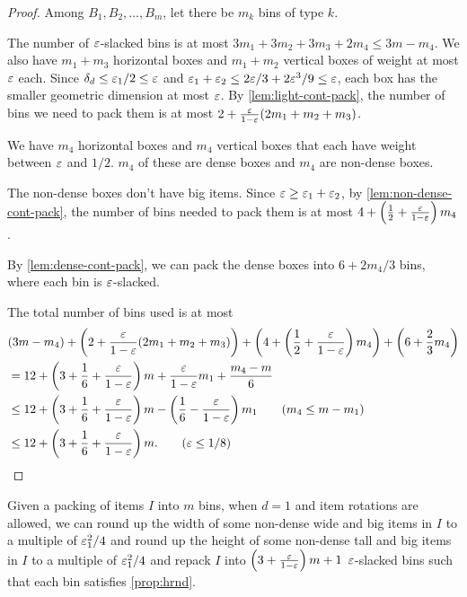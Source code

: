 \begin{proof}
Among $B_1, B_2, \ldots, B_m$, let there be $m_k$ bins of type $k$.

The number of $\varepsilon$-slacked bins is at most
$3m_1 + 3m_2 + 3m_3 + 2m_4 \le 3m - m_4$.
We also have $m_1 + m_3$ horizontal boxes and $m_1 + m_2$ vertical boxes
of weight at most $\varepsilon$ each. Since $\delta_d \le \varepsilon_1/2 \le \varepsilon$
and $\varepsilon_1 + \varepsilon_2 \le 2\varepsilon/3 + 2\varepsilon^3/9 \le \varepsilon$, each box has the smaller
geometric dimension at most $\varepsilon$.
By \cref{lem:light-cont-pack}, the number of bins we need to pack them is at most
$2 + \frac{\varepsilon}{1-\varepsilon}(2m_1 + m_2 + m_3)$.

We have $m_4$ horizontal boxes and $m_4$ vertical boxes
that each have weight between $\varepsilon$ and $1/2$.
$m_4$ of these are dense boxes and $m_4$ are non-dense boxes.

The non-dense boxes don't have big items. Since $\varepsilon \ge \varepsilon_1 + \varepsilon_2$,
by \cref{lem:non-dense-cont-pack}, the number of bins needed to pack them is at most
$4 + \left(\frac{1}{2} + \frac{\varepsilon}{1-\varepsilon}\right)m_4$.

By \cref{lem:dense-cont-pack}, we can pack the dense boxes into
$6 + 2m_4/3$ bins, where each bin is $\varepsilon$-slacked.

The total number of bins used is at most
\begin{align*}
& (3m - m_4) + \left(2 + \frac{\eps}{1-\eps}(2m_1 + m_2 + m_3)\right)
 + \left(4 + \left(\frac{1}{2} + \frac{\eps}{1-\eps}\right)m_4\right)
+ \left(6 + \frac{2}{3}m_4\right)
\\ &= 12 + \left(3 + \frac{1}{6} + \frac{\eps}{1-\eps}\right)m
    + \frac{\eps}{1-\eps}m_1 + \frac{m_4-m}{6}
\\ &\le 12 + \left(3 + \frac{1}{6} + \frac{\eps}{1-\eps}\right)m
    - \left(\frac{1}{6} - \frac{\eps}{1-\eps}\right)m_1
\tag{$m_4 \le m - m_1$}
\\ &\le 12 + \left(3 + \frac{1}{6} + \frac{\eps}{1-\eps} \right)m.
\tag{$\eps \le 1/8$}
\end{align*}
\end{proof}

\begin{lemma}
\label{lem:ws-1-pack-rot}
Given a packing of items $I$ into $m$ bins, when $d=1$ and item rotations are allowed, we can
round up the width of some non-dense wide and big items in $I$ to a multiple of $\varepsilon_1^2/4$
and round up the height of some non-dense tall and big items in $I$ to a multiple of $\varepsilon_1^2/4$
and repack $I$ into $\left(3 + \frac{\varepsilon}{1-\varepsilon}\right)m + 1$
$\varepsilon$-slacked bins such that each bin satisfies \cref{prop:hrnd}.
\end{lemma}

